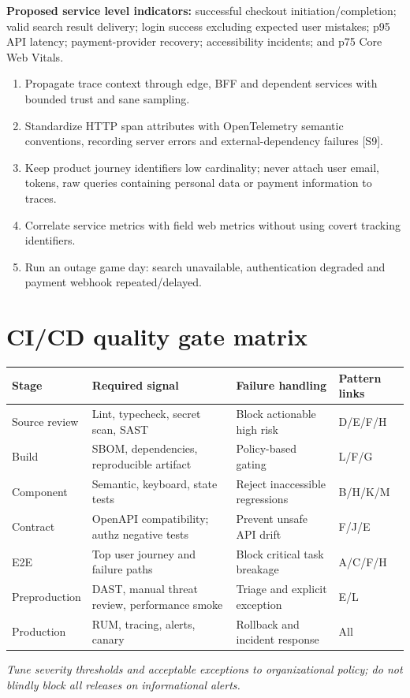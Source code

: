 \documentclass[11pt]{article}
\begin{document}
\textbf{Proposed service level indicators:} successful checkout initiation/completion; valid search result delivery; login success excluding expected user mistakes; p95 API latency; payment-provider recovery; accessibility incidents; and p75 Core Web Vitals.
\begin{enumerate}
\item Propagate trace context through edge, BFF and dependent services with bounded trust and sane sampling.
\item Standardize HTTP span attributes with OpenTelemetry semantic conventions, recording server errors and external-dependency failures [S9].
\item Keep product journey identifiers low cardinality; never attach user email, tokens, raw queries containing personal data or payment information to traces.
\item Correlate service metrics with field web metrics without using covert tracking identifiers.
\item Run an outage game day: search unavailable, authentication degraded and payment webhook repeated/delayed.
\end{enumerate}

\section{CI/CD quality gate matrix}

\begin{longtable}{@{}>{\raggedright\arraybackslash}p{30mm}>{\raggedright\arraybackslash}p{42mm}>{\raggedright\arraybackslash}p{41mm}>{\raggedright\arraybackslash}p{29mm}@{}}\toprule
Stage & Required signal & Failure handling & Pattern links\\\midrule\endhead
Source review & Lint, typecheck, secret scan, SAST & Block actionable high risk & D/E/F/H\\
Build & SBOM, dependencies, reproducible artifact & Policy-based gating & L/F/G\\
Component & Semantic, keyboard, state tests & Reject inaccessible regressions & B/H/K/M\\
Contract & OpenAPI compatibility; authz negative tests & Prevent unsafe API drift & F/J/E\\
E2E & Top user journey and failure paths & Block critical task breakage & A/C/F/H\\
Preproduction & DAST, manual threat review, performance smoke & Triage and explicit exception & E/L\\
Production & RUM, tracing, alerts, canary & Rollback and incident response & All\\
\bottomrule\end{longtable}
\textit{Tune severity thresholds and acceptable exceptions to organizational policy; do not blindly block all releases on informational alerts.}
\end{document}
